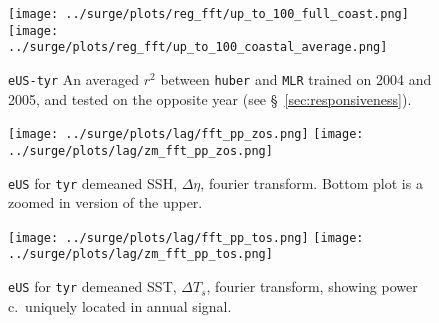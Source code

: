 
\begin{figure*}
\centering

\vspace{-35pt}
       \texttt{[image: ../surge/plots/reg\_fft/up\_to\_100\_full\_coast.png]}
        \texttt{[image: ../surge/plots/reg\_fft/up\_to\_100\_coastal\_average.png]}
            \caption{\texttt{eUS-tyr} An averaged $r^2$ between \texttt{huber} and \texttt{MLR} trained on 2004 and 2005,
                    and tested on the opposite year (see §~\ref{sec:responsiveness}).}
            \label{fig:lpredthresh}

\begin{minipage}{0.45\textwidth}
\texttt{[image: ../surge/plots/lag/fft\_pp\_zos.png]}
            \texttt{[image: ../surge/plots/lag/zm\_fft\_pp\_zos.png]}
            \caption{\texttt{eUS} for \texttt{tyr} demeaned SSH, $\Delta\eta$, fourier transform. Bottom plot is a zoomed in version of the upper.}
            \label{fig:zm_fft_zos}
            \end{minipage}\begin{minipage}{0.45\textwidth}

        \texttt{[image: ../surge/plots/lag/fft\_pp\_tos.png]}
            \texttt{[image: ../surge/plots/lag/zm\_fft\_pp\_tos.png]}
            \caption{\texttt{eUS} for \texttt{tyr} demeaned SST, $\Delta T_s$, fourier transform,
                     showing power c.~uniquely located in annual signal.}
            \label{fig:zm_fft_tos}
            \end{minipage}

\end{figure*}
